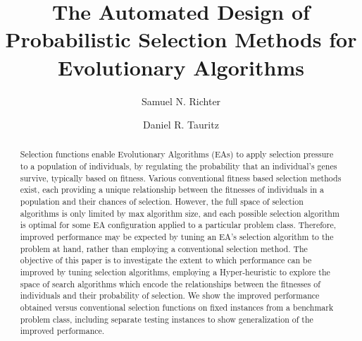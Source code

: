 \documentclass[sigconf]{acmart}
\begin{document}


\title[The Automated Design of Probabilistic Selection\\Methods for Evolutionary Algorithms]{The Automated Design of Probabilistic Selection Methods for Evolutionary Algorithms}

\author{Samuel N. Richter}

\author{Daniel R. Tauritz}

\begin{abstract}
Selection functions enable Evolutionary Algorithms (EAs) to apply selection pressure to a population of individuals, by regulating the probability that an individual's genes survive, typically based on fitness. Various conventional fitness based selection methods exist, each providing a unique relationship between the fitnesses of individuals in a population and their chances of selection. 
However, the full space of selection algorithms is only limited by max algorithm size, and each possible selection algorithm is optimal for some EA configuration applied to a particular problem class. Therefore, improved performance may be expected by tuning an EA's selection algorithm to the problem at hand, rather than employing a conventional selection method. The objective of this paper is to investigate the extent to which performance can be improved by tuning selection algorithms, employing a Hyper-heuristic to explore the space of search algorithms which encode the relationships between the fitnesses of individuals and their probability of selection. We show the improved performance obtained versus conventional selection functions on fixed instances from a benchmark problem class, including separate testing instances to show generalization of the improved performance.
\end{abstract}
\end{document}
